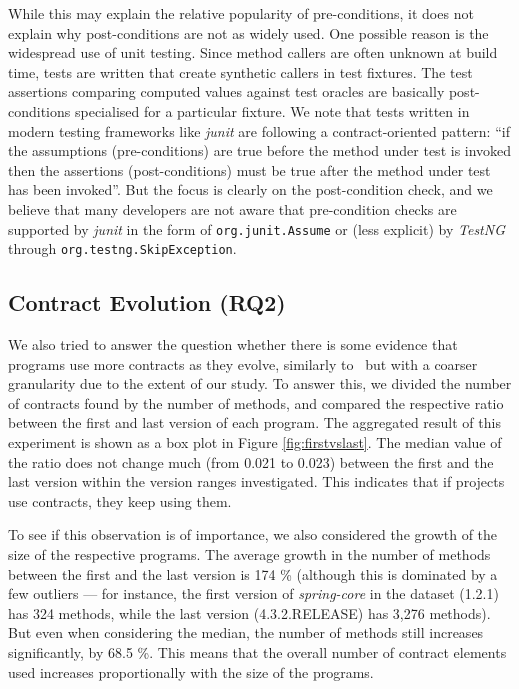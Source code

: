 \documentclass[a4paper,UKenglish]{lipics-v2016}
\begin{document}
While this may explain the relative popularity of pre-conditions, it does not explain why post-conditions are not as widely used. One possible reason is the widespread use of unit testing. Since method callers are often unknown at build time, tests are written that create synthetic callers in test fixtures. The test assertions comparing computed values against test oracles are basically post-conditions specialised for a particular  fixture. We note that tests written in modern testing frameworks like \textit{junit} are following a contract-oriented pattern: “if the assumptions (pre-conditions) are true before the method under test is invoked then the assertions (post-conditions) must be true after the method under test has been invoked”. But the focus is clearly on the post-condition check, and we believe that many developers are not aware that pre-condition checks are supported by \textit{junit} in the form of \texttt{org.junit.Assume} or (less explicit) by \textit{TestNG} through \texttt{org.testng.SkipException}. 




\subsection{Contract Evolution (RQ2)}
\label{ssec:results:evolution}

We also tried to answer the question whether there is some evidence that programs use more contracts as they evolve, similarly to~\cite{EFNPM14} but with a coarser granularity due to the extent of our study. To answer this, we divided the number of contracts found by the number of methods, and compared the respective ratio between the first and last version of each program. The aggregated result of this experiment is shown as a box plot in Figure \ref{fig:firstvslast}. The median value of the ratio does not change much (from 0.021 to 0.023) between the first and the last version within the version ranges investigated.  This indicates that if projects use contracts, they keep using them. 

To see if this observation is of importance, we also considered the growth of the size of the respective programs. The average growth in the number of methods between the first and the last version is 174 \% (although this is dominated by a few outliers --- for instance, the first version of \textit{spring-core} in the dataset (1.2.1) has 324 methods, while the last version (4.3.2.RELEASE) has 3,276 methods). But even when considering the median, the number of methods still increases significantly, by 68.5 \%. This means that the overall number of contract elements used increases proportionally with the size of the programs.
\end{document}
